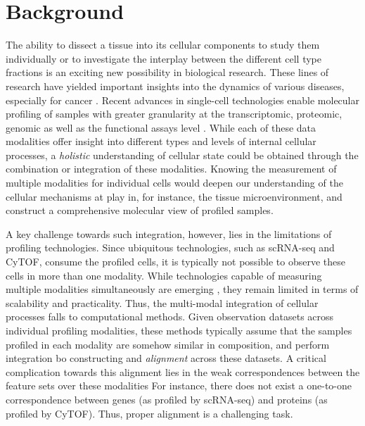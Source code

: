 \section{Background}
The ability to dissect a tissue into its cellular components to study them individually or to investigate the interplay between the different cell type fractions is an exciting new possibility in biological research.
These lines of research have yielded important insights into the dynamics of various diseases, especially for cancer  \cite{Chevrier2017,Tirosh2016}.
Recent advances in single-cell technologies enable molecular profiling of samples with greater granularity at the transcriptomic, proteomic, genomic as well as the functional assays level \cite{Irmisch2020,Rozenblatt2017}.
While each of these data modalities offer insight into different types and levels of internal cellular processes,
a \textit{holistic} understanding of cellular state could be obtained through the combination or integration of these modalities.
Knowing the measurement of multiple modalities for individual cells would deepen our understanding of the cellular mechanisms at play in, for instance, the tissue microenvironment, and construct a comprehensive molecular view of profiled samples.

A key challenge towards such integration, however, lies in the limitations of profiling technologies.
Since ubiquitous technologies, such as scRNA-seq and CyTOF, consume the profiled cells, it is typically not possible to observe these cells in more than one modality.
While technologies capable of measuring multiple modalities simultaneously are emerging \cite{Stoeckius2017,Zhu2020}, they remain limited in terms of scalability and practicality.
Thus, the multi-modal integration of cellular processes falls to computational methods.
Given observation datasets across individual profiling modalities, these methods typically assume that the samples profiled in each modality are somehow similar in composition, and perform integration bo constructing and \textit{alignment} across these datasets.
A critical complication towards this alignment lies in the weak correspondences between the feature sets over these modalities
For instance, there does not exist a one-to-one correspondence between genes (as profiled by scRNA-seq) and proteins (as profiled by CyTOF).
Thus, proper alignment is a challenging task.

